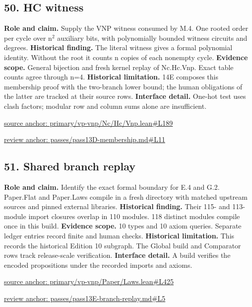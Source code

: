 \documentclass[11pt,letterpaper]{article}
\theoremstyle{definition}\newtheorem{definition}[theorem]{Definition}\newtheorem{example}[theorem]{Example}
\theoremstyle{remark}\newtheorem{remark}[theorem]{Remark}
\begin{document}
\subsection*{50. HC witness}
\textbf{Role and claim.} Supply the VNP witness consumed by M.4. One rooted order per cycle over n\ensuremath{{}^2} auxiliary bits, with polynomially bounded witness circuits and degrees.
\textbf{Historical finding.} The literal witness gives a formal polynomial identity. Without the root it counts n copies of each nonempty cycle.
\textbf{Evidence scope.} General bijection and fresh kernel replay of Nc.Hc.Vnp. Exact table counts agree through n=4.
\textbf{Historical limitation.} 14E composes this membership proof with the two-branch lower bound; the human obligations of the latter are tracked at their source rows.
\textbf{Interface detail.} One-hot test uses clash factors; modular row and column sums alone are insufficient.
\par\href{https://github.com/nousentllc/VP-VNP-Review/blob/8a7976933b6b2b4ffda1ad3a0dfb5fc6b6f023e8/primary/vp-vnp/Nc/Hc/Vnp.lean\#L189}{source anchor: primary/vp-vnp/Nc/Hc/Vnp.lean\#L189}
\par\href{https://github.com/nousentllc/VP-VNP-Review/blob/8a7976933b6b2b4ffda1ad3a0dfb5fc6b6f023e8/passes/pass13D-membership.md\#L11}{review anchor: passes/pass13D-membership.md\#L11}
\goodbreak
{}
\hypertarget{claim.51}{}
\subsection*{51. Shared branch replay}
\textbf{Role and claim.} Identify the exact formal boundary for E.4 and G.2. Paper.Flat and Paper.Laws compile in a fresh directory with matched upstream sources and pinned external libraries.
\textbf{Historical finding.} Their 115- and 113-module import closures overlap in 110 modules. 118 distinct modules compile once in this build.
\textbf{Evidence scope.} 10 types and 10 axiom queries. Separate ledger entries record finite and human checks.
\textbf{Historical limitation.} This records the historical Edition 10 subgraph. The Global build and Comparator rows track release-scale verification.
\textbf{Interface detail.} A build verifies the encoded propositions under the recorded imports and axioms.
\par\href{https://github.com/nousentllc/VP-VNP-Review/blob/8a7976933b6b2b4ffda1ad3a0dfb5fc6b6f023e8/primary/vp-vnp/Paper/Laws.lean\#L425}{source anchor: primary/vp-vnp/Paper/Laws.lean\#L425}
\par\href{https://github.com/nousentllc/VP-VNP-Review/blob/8a7976933b6b2b4ffda1ad3a0dfb5fc6b6f023e8/passes/pass13E-branch-replay.md\#L5}{review anchor: passes/pass13E-branch-replay.md\#L5}
\goodbreak
{}
\hypertarget{claim.52}{}
\end{document}
